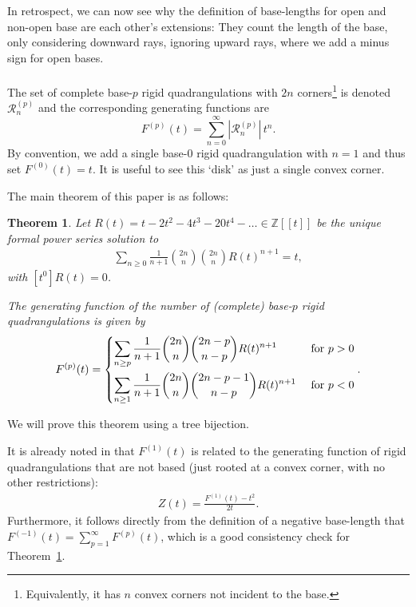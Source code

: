 \documentclass[11pt]{article}
\theoremstyle{plain}
\newtheorem{theorem}{Theorem}
\theoremstyle{definition}
\newcommand{\Z}{\mathbb{Z}}
\begin{document}
In retrospect, we can now see why the definition of base-lengths for open and non-open base are each other's extensions: They count the length of the base, only considering downward rays, ignoring upward rays, where we add a minus sign for open bases. 
\\\\
The set of complete base-$p$ rigid quadrangulations with $2n$ corners\footnote{Equivalently, it has $n$ convex corners not incident to the base.} is denoted $\mathcal{R}^{(p)}_n$ and the corresponding generating functions are
\begin{equation}
    F^{(p)}(t) = \sum_{n=0}^\infty  |\mathcal{R}^{(p)}_{n}|\,t^n.
\end{equation}
By convention, we add a single base-$0$ rigid quadrangulation with $n=1$ and thus set $F^{(0)}(t) = t$. 
It is useful to see this `disk' as just a single convex corner.

The main theorem of this paper is as follows:
\begin{theorem}\label{thm:gen_fun_rigid}
    Let $R(t)=t-2t^2-4t^3-20t^4-\ldots\in\Z[[t]]$ be the unique formal power series solution to
    \begin{align}\label{eq:R_def}
        \sum_{n\geq0}\frac{1}{n+1}\binom{2n}{n}\binom{2n}{n} R(t)^{n+1} = t,
    \end{align}
    with $[t^0]R(t)=0$.

    The generating function of the number of (complete) base-$p$ rigid quadrangulations is given by
    \begin{align}
        F^{(p)}(t) =
        \begin{dcases}
            \sum_{n\geq p}\frac{1}{n+1}\binom{2n}{n}\binom{2n-p}{n-p} R(t)^{n+1}&\textrm{ for }p>0\\
            \sum_{n\geq 1}\frac{1}{n+1}\binom{2n}{n}\binom{2n-p-1}{n-p} R(t)^{n+1}&\textrm{ for }p<0\\
        \end{dcases}.
    \end{align}
\end{theorem}
We will prove this theorem using a tree bijection.

It is already noted in \cite{Budd_rectilinear_2025} that $F^{(1)}(t)$ is related to the generating function of rigid quadrangulations that are not based (just rooted at a convex corner, with no other restrictions):
\begin{align}
    Z(t)=\frac{F^{(1)}(t)-t^2}{2t}.
\end{align} 
Furthermore, it follows directly from the definition of a negative base-length that $F^{(-1)}(t)=\sum_{p=1}^{\infty}F^{(p)}(t)$, which is a good consistency check for Theorem~\ref{thm:gen_fun_rigid}.
\end{document}
